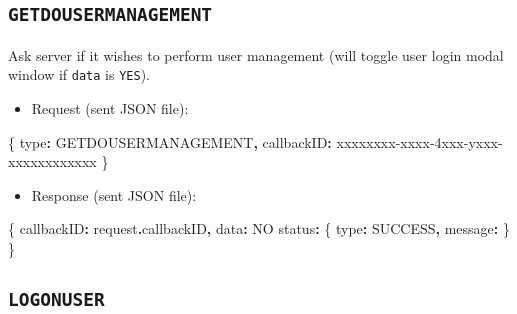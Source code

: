 \documentclass[
]{book}
\newenvironment{Shaded}{\begin{snugshade}}{\end{snugshade}}
\newcommand{\AttributeTok}[1]{\textcolor[rgb]{0.77,0.63,0.00}{#1}}
\newcommand{\NormalTok}[1]{#1}
\newcommand{\OperatorTok}[1]{\textcolor[rgb]{0.81,0.36,0.00}{\textbf{#1}}}
\newcommand{\StringTok}[1]{\textcolor[rgb]{0.31,0.60,0.02}{#1}}
\providecommand{\tightlist}{%
  \setlength{\itemsep}{0pt}\setlength{\parskip}{0pt}}
\begin{document}
\hypertarget{getdousermanagement}{%
\subsection{\texorpdfstring{\texttt{GETDOUSERMANAGEMENT}}{GETDOUSERMANAGEMENT}}\label{getdousermanagement}}

Ask server if it wishes to perform user management (will toggle user login modal window if \texttt{data} is \texttt{YES}).

\begin{itemize}
\tightlist
\item
  Request (sent JSON file):
\end{itemize}

\begin{Shaded}
\begin{Highlighting}[]
\NormalTok{\{}
  \StringTok{\textquotesingle{}type\textquotesingle{}}\OperatorTok{:} \StringTok{\textquotesingle{}GETDOUSERMANAGEMENT\textquotesingle{}}\OperatorTok{,}
  \StringTok{\textquotesingle{}callbackID\textquotesingle{}}\OperatorTok{:} \StringTok{\textquotesingle{}xxxxxxxx{-}xxxx{-}4xxx{-}yxxx{-}xxxxxxxxxxxx\textquotesingle{}}
\NormalTok{\}}
\end{Highlighting}
\end{Shaded}

\begin{itemize}
\tightlist
\item
  Response (sent JSON file):
\end{itemize}

\begin{Shaded}
\begin{Highlighting}[]
\NormalTok{\{}
  \StringTok{\textquotesingle{}callbackID\textquotesingle{}}\OperatorTok{:}\NormalTok{ request}\OperatorTok{.}\AttributeTok{callbackID}\OperatorTok{,}
  \StringTok{\textquotesingle{}data\textquotesingle{}}\OperatorTok{:} \StringTok{\textquotesingle{}NO\textquotesingle{}}
  \StringTok{\textquotesingle{}status\textquotesingle{}}\OperatorTok{:}\NormalTok{ \{}
    \StringTok{\textquotesingle{}type\textquotesingle{}}\OperatorTok{:} \StringTok{\textquotesingle{}SUCCESS\textquotesingle{}}\OperatorTok{,}
    \StringTok{\textquotesingle{}message\textquotesingle{}}\OperatorTok{:} \StringTok{\textquotesingle{}\textquotesingle{}}
\NormalTok{  \}}
\NormalTok{\}}
\end{Highlighting}
\end{Shaded}

\hypertarget{logonuser}{%
\subsection{\texorpdfstring{\texttt{LOGONUSER}}{LOGONUSER}}\label{logonuser}}
\end{document}
